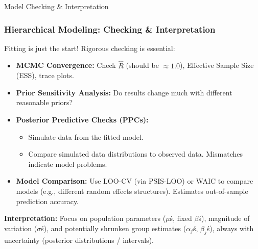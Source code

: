 \documentclass[aspectratio=169]{beamer}
\begin{document}
\begin{frame}[fragile]{Model Checking \& Interpretation}
    \frametitle{Hierarchical Modeling: Checking \& Interpretation}
    Fitting is just the start! Rigorous checking is essential:
    \pause
    \begin{itemize}
        \item \textbf{MCMC Convergence:} Check $\hat{R}$ (should be $\approx 1.0$), Effective Sample Size (ESS), trace plots.
        \pause
        \item \textbf{Prior Sensitivity Analysis:} Do results change much with different reasonable priors?
        \pause
        \item \textbf{Posterior Predictive Checks (PPCs):}
        \begin{itemize}
            \item Simulate data from the fitted model.
            \item Compare simulated data distributions to observed data. Mismatches indicate model problems.
        \end{itemize}
        \pause
        \item \textbf{Model Comparison:} Use LOO-CV (via PSIS-LOO) or WAIC to compare models (e.g., different random effects structures). Estimates out-of-sample prediction accuracy.
    \end{itemize}
    \pause
    \vfill
    \textbf{Interpretation:} Focus on population parameters ($\mu$\'s, fixed $\beta$\'s), magnitude of variation ($\sigma$\'s), and potentially shrunken group estimates ($\alpha_j$\'s, $\beta_j$\'s), always with uncertainty (posterior distributions / intervals).
\end{frame}
\end{document}
